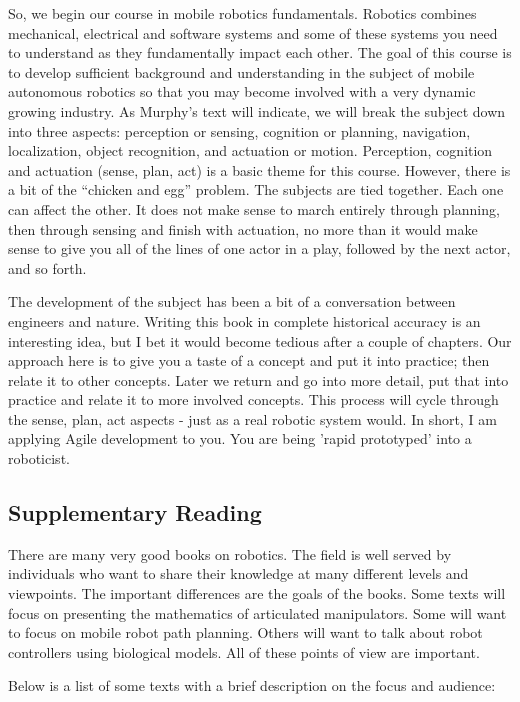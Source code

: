 So, we begin our course in mobile robotics fundamentals. Robotics
combines mechanical, electrical and software systems and some of these
systems you need to understand as they fundamentally impact each other.
The goal of this course is to develop sufficient background and
understanding in the subject of mobile autonomous robotics so that you
may become involved with a very dynamic growing industry. As Murphy's
text will indicate, we will break the subject down into three aspects:
perception or sensing, cognition or planning, navigation, localization,
object recognition, and actuation or motion. Perception, cognition and
actuation (sense, plan, act) is a basic theme for this course. However,
there is a bit of the ``chicken and egg'' problem. The subjects are tied
together. Each one can affect the other. It does not make sense to march
entirely through planning, then through sensing and finish with
actuation, no more than it would make sense to give you all of the lines
of one actor in a play, followed by the next actor, and so forth.

The development of the subject has been a bit of a conversation between
engineers and nature. Writing this book in complete historical accuracy
is an interesting idea, but I bet it would become tedious after a couple
of chapters. Our approach here is to give you a taste of a concept and
put it into practice; then relate it to other concepts. Later we return
and go into more detail, put that into practice and relate it to more
involved concepts. This process will cycle through the sense, plan, act
aspects - just as a real robotic system would. In short, I am applying
Agile development to you. You are being 'rapid prototyped' into a
roboticist.

\hypertarget{supplementary-reading}{%
\subsection{Supplementary Reading}\label{supplementary-reading}}

There are many very good books on robotics. The field is well served by
individuals who want to share their knowledge at many different levels
and viewpoints. The important differences are the goals of the books.
Some texts will focus on presenting the mathematics of articulated
manipulators. Some will want to focus on mobile robot path planning.
Others will want to talk about robot controllers using biological
models. All of these points of view are important.

Below is a list of some texts with a brief description on the focus and
audience:

